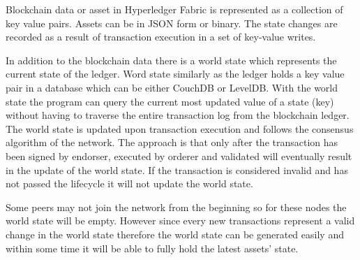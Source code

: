 Blockchain data or asset in Hyperledger Fabric is represented as a collection of key value pairs. Assets can be in JSON form or binary. The state changes are recorded as a result of transaction execution in a set of key-value writes. 


In addition to the blockchain data there is a world state which represents the current state of the ledger. Word state similarly as the ledger holds a key value pair in a database which can be either CouchDB or LevelDB. With the world state the program can query the current most updated value of a state (key) without having to traverse the entire transaction log from the blockchain ledger. The world state is updated upon transaction execution and follows the consensus algorithm of the network. The approach is that only after the transaction has been signed by endorser, executed by orderer and validated will eventually result in the update of the world state. If the transaction is considered invalid and has not passed the lifecycle it will not update the world state. 

Some peers may not join the network from the beginning so for these nodes the world state will be empty. However since every new transactions represent a valid change in the world state therefore the world state can be generated easily and within some time it will be able to fully hold the latest assets' state.  
